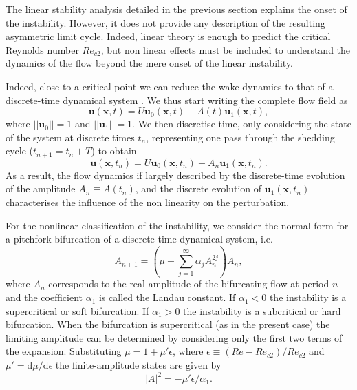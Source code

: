 The linear stability analysis detailed in the previous section explains the onset of the instability. However, it does not provide any description of the resulting asymmetric limit cycle. Indeed, linear theory is enough to predict the critical Reynolds number $Re_{c2}$, but non linear effects must be included to understand the dynamics of the flow beyond the mere onset of the linear instability. 

Indeed, close to a critical point we can reduce the wake dynamics to that of a discrete-time dynamical system \citep{henderson-barkley-1996,henderson-1997}. We thus start writing the complete flow field as
%
\begin{equation}
  \bm{u}(\bm{x},t) =  U \bm{u}_0(\bm{x},t) + A(t) \bm{u}_1(\bm{x},t),
\end{equation}
%
where $|| \bm{u}_0 || = 1 $ and $|| \bm{u}_1 || = 1$. We then discretise time, only considering the state of the system at discrete times $t_n$, representing one pass through the shedding cycle ($t_{n+1} = t_n + T$) to obtain
%
\begin{equation}
  \bm{u}(\bm{x},t_n) = U \bm{u}_0(\bm{x},t_n) + A_n \bm{u}_1(\bm{x},t_n).
\end{equation}
%
As a result, the flow dynamics if largely described by the discrete-time evolution of the amplitude $A_n \equiv A(t_n)$, and the discrete evolution of $\bm{u}_1(\bm{x},t_n)$ characterises the influence of the non linearity on the perturbation.

For the nonlinear classification of the instability, we consider the normal form for a pitchfork bifurcation of a discrete-time dynamical system, i.e. 
%
\begin{equation}
  A_{n+1} = \left( \mu  + \sum_{j=1}^\infty \alpha_j A_n^{2j} \right) A_n,
\end{equation}
%
where $A_n$ corresponds to the real amplitude of the bifurcating flow at period $n$ and the coefficient $\alpha_1$ is called the Landau constant. If $\alpha_1 <0$ the instability is a supercritical or soft bifurcation. If $\alpha_1>0$ the instability is a subcritical or hard bifurcation. When the bifurcation is supercritical (as in the present case) the limiting amplitude can be determined by considering only the first two terms of the expansion. Substituting $\mu = 1 + \mu' \epsilon$, where $\epsilon \equiv (Re - Re_{c2})/Re_{c2}$ and $\mu' = \text{d}\mu/\text{d}\epsilon$ the finite-amplitude states are given by
%
\begin{equation}
  |A|^2 =- \mu' \epsilon / \alpha_1.
\end{equation}

